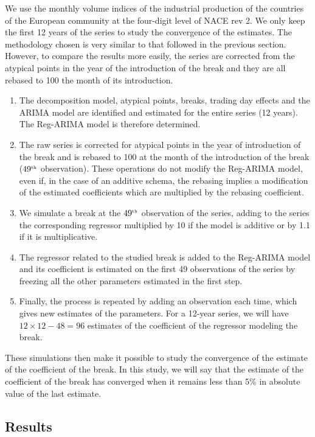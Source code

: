 \documentclass[12pt, a4paper]{article}
\begin{document}
We use the monthly volume indices of the industrial production of the countries of the European community at the four-digit level of NACE rev 2. We only keep the first 12 years of the series to study the convergence of the estimates.
The methodology chosen is very similar to that followed in the previous section. However, to compare the results more easily, the series are corrected from the atypical points in the year of the introduction of the break and they are all rebased to 100 the month of its introduction.
\begin{enumerate}
	\item The decomposition model, atypical points, breaks, trading day effects and the ARIMA model are identified and estimated for the entire series (12 years). The Reg-ARIMA model is therefore determined.
	\item The raw series is corrected for atypical points in the year of introduction of the break and is rebased to 100 at the month of the introduction of the break ($49^{\mbox{\tiny th}}$ observation). These operations do not modify the Reg-ARIMA model, even if, in the case of an additive schema, the rebasing implies a modification of the estimated coefficients which are multiplied by the rebasing coefficient.
	\item We simulate a break at the $49^{\mbox{\tiny th}}$ observation of the series, adding to the series the corresponding regressor multiplied by 10 if the model is additive or by 1.1 if it is multiplicative.
	\item The regressor related to the studied break is added to the Reg-ARIMA model and its coefficient is estimated on the first 49 observations of the series by freezing all the other parameters estimated in the first step.
	\item Finally, the process is repeated by adding an observation each time, which gives new estimates of the parameters. For a 12-year series, we will have $12\times12 - 48 = 96$ estimates of the coefficient of the regressor modeling the break.
\end{enumerate}
These simulations then make it possible to study the convergence of the estimate of the coefficient of the break. In this study, we will say that the estimate of the coefficient of the break has converged when it remains less than 5\% in absolute value of the last estimate.

\subsection{Results}
\end{document}
